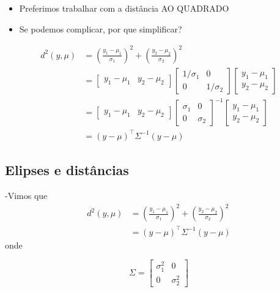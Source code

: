 \documentclass[
  letterpaper,
  DIV=11,
  numbers=noendperiod]{scrartcl}
\providecommand{\tightlist}{%
  \setlength{\itemsep}{0pt}\setlength{\parskip}{0pt}}\usepackage{longtable,booktabs,array}
\begin{document}
\begin{itemize}
\tightlist
\item
  Preferimos trabalhar com a distância AO QUADRADO
\item
  Se podemos complicar, por que simplificar?
\end{itemize}

\begin{align}
d^2(y,\mu) &= \left(\frac{y_1-\mu_1}{\sigma_1}\right)^2 + \left(\frac{y_2-\mu_2}{\sigma_2}\right)^2 \\
&= \begin{bmatrix}y_1 - \mu_1& y_2- \mu_2\end{bmatrix} \begin{bmatrix}1/\sigma_1 & 0 \\ 0 & 1/\sigma_2\end{bmatrix}\begin{bmatrix}y_1 - \mu_1 \\ y_2 - \mu_2\end{bmatrix}\\
&= \begin{bmatrix}y_1 - \mu_1& y_2- \mu_2\end{bmatrix} \begin{bmatrix}\sigma_1 & 0 \\ 0 & \sigma_2\end{bmatrix}^{-1}\begin{bmatrix}y_1 - \mu_1 \\ y_2 - \mu_2\end{bmatrix}\\
&= (y-\mu)^\top \Sigma^{-1}(y-\mu)
\end{align}

\hypertarget{elipses-e-distuxe2ncias}{%
\subsection{Elipses e distâncias}\label{elipses-e-distuxe2ncias}}

-Vimos que \begin{align}
d^2(y,\mu) &= \left(\frac{y_1-\mu_1}{\sigma_1}\right)^2 + \left(\frac{y_2-\mu_2}{\sigma_2}\right)^2 \\
&= (y-\mu)^\top \Sigma^{-1}(y-\mu)
\end{align} onde

\[ \Sigma = \begin{bmatrix} \sigma_1^2 & 0 \\ 0 & \sigma_2^2\end{bmatrix}\]
\end{document}
